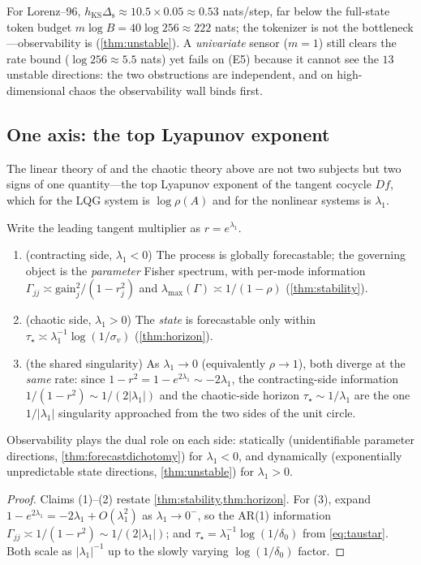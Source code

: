\documentclass[10pt]{article}
\theoremstyle{plain}
\theoremstyle{definition}
\theoremstyle{remark}
\newcommand{\Gam}{\Gamma}
\newcommand{\hKS}{h_{\mathrm{KS}}}
\begin{document}
\begin{remark}
For Lorenz--96, $\hKS\Delta_{\mathrm s}\approx10.5\times0.05\approx0.53$ nats/step,
far below the full-state token budget $m\log B=40\log256\approx222$ nats; the
tokenizer is not the bottleneck---observability is (\cref{thm:unstable}). A
\emph{univariate} sensor ($m=1$) still clears the rate bound ($\log256\approx5.5$
nats) yet fails on (E5) because it cannot see the $13$ unstable directions: the
two obstructions are independent, and on high-dimensional chaos the observability
wall binds first.
\end{remark}

\subsection{One axis: the top Lyapunov exponent}
The linear theory of  and the chaotic theory
above are not two subjects but two signs of one quantity---the top Lyapunov
exponent of the tangent cocycle $Df$, which for the LQG system is $\log\rho(A)$
and for the nonlinear systems is $\lambda_1$.

\begin{proposition}
\label{prop:master}
Write the leading tangent multiplier as $r=e^{\lambda_1}$.
\begin{enumerate}[leftmargin=1.7em,itemsep=1pt]
\item \textup{(contracting side, $\lambda_1<0$)} The process is globally
forecastable; the governing object is the \emph{parameter} Fisher spectrum, with
per-mode information $\Gam_{jj}\asymp\mathrm{gain}_j^2/(1-r_j^2)$ and
$\lambda_{\max}(\Gam)\asymp1/(1-\rho)$ \textup{(}\cref{thm:stability}\textup{)}.
\item \textup{(chaotic side, $\lambda_1>0$)} The \emph{state} is forecastable only
within $\tau_\star\asymp\lambda_1^{-1}\log(1/\sigma_v)$
\textup{(}\cref{thm:horizon}\textup{)}.
\item \textup{(the shared singularity)} As $\lambda_1\to0$ (equivalently
$\rho\to1$), both diverge at the \emph{same} rate: since $1-r^2=1-e^{2\lambda_1}
\sim-2\lambda_1$, the contracting-side information $1/(1-r^2)\sim1/(2|\lambda_1|)$
and the chaotic-side horizon $\tau_\star\sim1/\lambda_1$ are the one
$1/|\lambda_1|$ singularity approached from the two sides of the unit circle.
\end{enumerate}
Observability plays the dual role on each side: statically (unidentifiable
parameter directions, \cref{thm:forecastdichotomy}) for $\lambda_1<0$, and
dynamically (exponentially unpredictable state directions, \cref{thm:unstable})
for $\lambda_1>0$.
\end{proposition}
\begin{proof}
Claims (1)--(2) restate \cref{thm:stability,thm:horizon}. For (3), expand
$1-e^{2\lambda_1}=-2\lambda_1+O(\lambda_1^2)$ as $\lambda_1\to0^-$, so the AR(1)
information $\Gam_{jj}\asymp1/(1-r^2)\sim1/(2|\lambda_1|)$; and $\tau_\star=
\lambda_1^{-1}\log(1/\delta_0)$ from \eqref{eq:taustar}. Both scale as
$|\lambda_1|^{-1}$ up to the slowly varying $\log(1/\delta_0)$ factor.
\end{proof}
\end{document}
